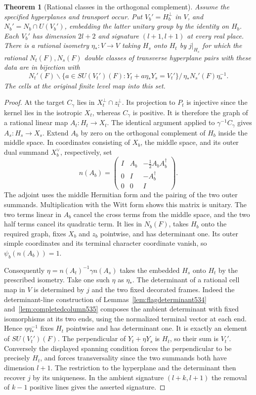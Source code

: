\documentclass[a4paper,11pt]{article}
\newtheorem{theorem}[proposition]{Theorem}
\theoremstyle{definition}
\theoremstyle{remark}
\numberwithin{equation}{section}
\begin{document}
\begin{theorem}[Rational classes in the orthogonal complement]
\leavevmode\label{thm:smallcomplement604}
Assume the specified hyperplanes and transport occur.
Put \(V_b'=H_b^\perp\) in \(V\), and
\(N_b'=N_b\cap U(V_b')\), embedding the latter unitary
group by the identity on \(H_b\). Each \(V_b'\) has dimension
\(2l+2\) and signature \((l+1,l+1)\) at every real place.
There is a rational isometry \(\eta_*:V\to V\) taking
\(H_s\) onto \(H_t\) by \(j|_{H_s}\) for which the rational
\(N_t(F),N_s(F)\) double classes of transverse hyperplane
pairs with these data are in bijection with
\[
 N_t'(F)\backslash
  \{a\in SU(V_t')(F):Y_t+a\eta_*Y_s=V_t'\}
       /\,\eta_*N_s'(F)\eta_*^{-1}.
\]
The cells at the original finite level map into this set.
\end{theorem}
\begin{proof}
At the target \(C_\gamma\) lies in \(X_t^\perp\cap z_t^\perp\).
Its projection to \(P_t\) is injective since the kernel lies in
the isotropic \(X_t\), whereas \(C_\gamma\) is positive.
It is therefore the graph of a rational linear map
\(A_t:H_t\to X_t\). The identical argument applied to
\(\gamma^{-1}C_\gamma\) gives \(A_s:H_s\to X_s\).
Extend \(A_b\) by zero on the orthogonal complement of \(H_b\)
inside the middle space. In coordinates consisting of \(X_b\),
the middle space, and its outer dual summand \(X_b^\vee\),
respectively, set
\[
 n(A_b)=
 \begin{pmatrix}
 I&A_b&-\tfrac12 A_b A_b^\dagger\\
 0&I&-A_b^\dagger\\
 0&0&I
 \end{pmatrix}.
\]
The adjoint uses the middle Hermitian form and the pairing of
the two outer summands. Multiplication with the Witt form
shows this matrix is unitary. The two terms linear in \(A_b\)
cancel the cross terms from the middle space, and the two
half terms cancel its quadratic term. It lies in \(N_b(F)\),
takes \(H_b\) onto the required graph, fixes \(X_b\) and
\(z_b\) pointwise, and has determinant one. Its outer simple
coordinates and its terminal character coordinate vanish,
so \(\psi_b(n(A_b))=1\).

Consequently \(\eta=n(A_t)^{-1}\gamma n(A_s)\) takes the
embedded \(H_s\) onto \(H_t\) by the prescribed isometry.
Take one such \(\eta\) as \(\eta_*\). The determinant of a
rational cell map in \(V\) is determined by \(j\) and the
two fixed decorated frames. Indeed the determinant-line
construction of Lemmas~\ref{lem:flagdeterminant534}
and~\ref{lem:completedcolumn535} composes the ambient
determinant with fixed isomorphisms at its two ends, using
the normalized terminal vector at each end. Hence
\(\eta\eta_*^{-1}\) fixes \(H_t\) pointwise and has determinant
one. It is exactly an element of \(SU(V_t')(F)\).
The perpendicular of \(Y_t+\eta Y_s\) is \(H_t\), so their
sum is \(V_t'\). Conversely the displayed spanning condition
forces the perpendicular to be precisely \(H_t\), and forces
transversality since the two summands both have dimension
\(l+1\). The restriction to the hyperplane and the determinant
then recover \(j\) by its uniqueness. In the ambient signature
\((l+k,l+1)\) the removal of \(k-1\) positive lines gives the
asserted signature.


\end{proof}
\end{document}
